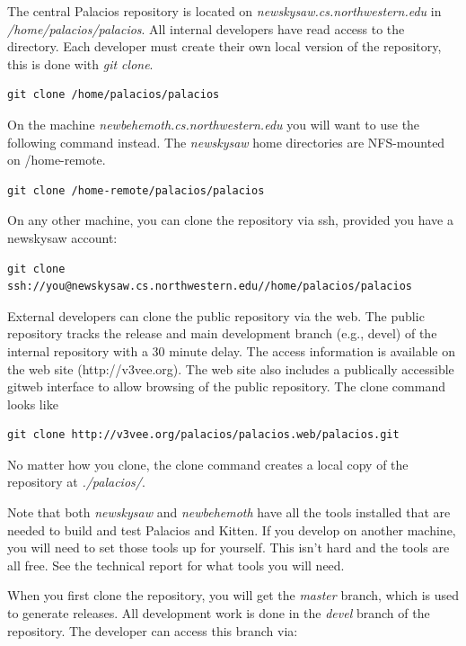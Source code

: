 \documentclass[11pt]{article}
\begin{document}
The central Palacios repository is located on {\em
newskysaw.cs.northwestern.edu} in {\em /home/palacios/palacios}. All
internal developers have read access to the directory. Each developer
must create their own local version of the repository, this is done
with {\em git clone}.

\begin{verbatim}
git clone /home/palacios/palacios
\end{verbatim}

On the machine {\em newbehemoth.cs.northwestern.edu} you will want to
use the following command instead. The {\em newskysaw} home
directories are NFS-mounted on /home-remote.

\begin{verbatim}
git clone /home-remote/palacios/palacios
\end{verbatim}


On any other machine, you can clone the repository via ssh, provided
you have a newskysaw account:
 
\begin{verbatim}
git clone ssh://you@newskysaw.cs.northwestern.edu//home/palacios/palacios
\end{verbatim}

External developers can clone the public repository via the web.  The
public repository tracks the release and main development branch
(e.g., devel) of the internal repository with a 30 minute delay.  The
access information is available on the web site (http://v3vee.org).
The web site also includes a publically accessible gitweb interface to
allow browsing of the public repository.  The clone command looks like

\begin{verbatim}
git clone http://v3vee.org/palacios/palacios.web/palacios.git
\end{verbatim}

No matter how you clone, the clone command creates a local copy of the
repository at {\em ./palacios/}.  

Note that both {\em newskysaw} and {\em newbehemoth} have all the
tools installed that are needed to build and test Palacios and Kitten.
If you develop on another machine, you will need to set those tools up
for yourself.  This isn't hard and the tools are all free.  See the
technical report for what tools you will need.

When you first clone the repository, you will get the {\em master}
branch, which is used to generate releases.   All development work is
done in the {\em devel} branch of the repository. The developer can
access this branch via:
\end{document}
